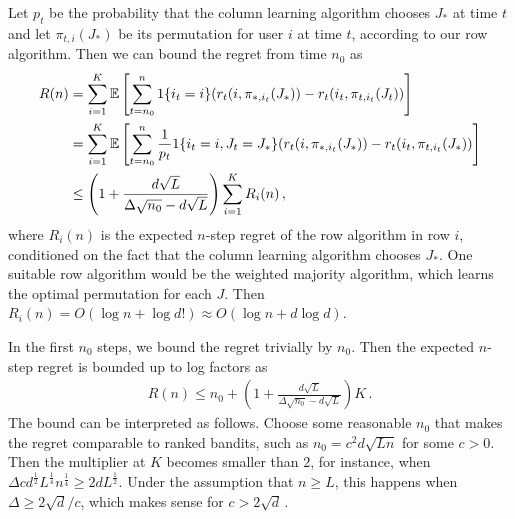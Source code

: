 Let $p_t$ be the probability that the column learning algorithm chooses $J_\ast$ at time $t$ and let $\pi_{t, i}(J_\ast)$ be its permutation for user $i$ at time $t$, according to our row algorithm. Then we can bound the regret from time $n_0$ as
\begin{align*}
  R(n)
  & = \sum_{i = 1}^K \mathbb{E}\left[\sum_{t = n_0}^n 1\{i_t = i\}
  (r_t(i, \pi_{\ast, i_t}(J_\ast)) - r_t(i_t, \pi_{t, i_t}(J_t))\right] \\
  & = \sum_{i = 1}^K \mathbb{E}\left[\sum_{t = n_0}^n \frac{1}{p_t} 1\{i_t = i, J_t = J_\ast\}
  (r_t(i, \pi_{\ast, i_t}(J_\ast)) - r_t(i_t, \pi_{t, i_t}(J_\ast))\right] \\
  & \leq \left(1 + \frac{d \sqrt{L}}{\Delta \sqrt{n_0} - d \sqrt{L}}\right) \sum_{i = 1}^K R_i(n)\,,
\end{align*}
where $R_i(n)$ is the expected $n$-step regret of the row algorithm in row $i$, conditioned on the fact that the column learning algorithm chooses $J_\ast$. One suitable row algorithm would be the weighted majority algorithm, which learns the optimal permutation for each $J$. Then $R_i(n) = O(\log n + \log d!) \approx O(\log n + d \log d)$.

In the first $n_0$ steps, we bound the regret trivially by $n_0$. Then the expected $n$-step regret is bounded up to log factors as
\begin{align*}
  R(n) \leq
  n_0 + \left(1 + \frac{d \sqrt{L}}{\Delta \sqrt{n_0} - d \sqrt{L}}\right) K\,.
\end{align*}
The bound can be interpreted as follows. Choose some reasonable $n_0$ that makes the regret comparable to ranked bandits, such as $n_0 = c^2 d \sqrt{L n}$ for some $c > 0$. Then the multiplier at $K$ becomes smaller than $2$, for instance, when $\Delta c d^\frac{1}{2} L^\frac{1}{4} n^\frac{1}{4} \geq 2 d L^\frac{1}{2}$. Under the assumption that $n \geq L$, this happens when $\Delta \geq 2 \sqrt{d} / c$, which makes sense for $c > 2 \sqrt{d}$\,.
